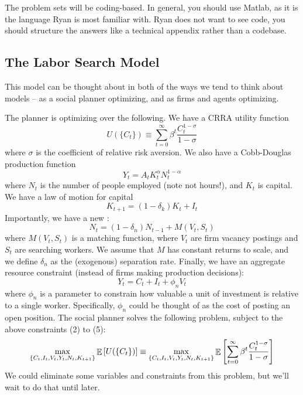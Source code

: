\documentclass[10pt]{article}
\begin{document}
The problem sets will be coding-based. In general, you should use Matlab, as it is the language Ryan is most familiar with. Ryan does not want to see code, you should structure the answers like a technical appendix rather than a codebase.

\subsection{The Labor Search Model}

This model can be thought about in both of the ways we tend to think about models -- as a social planner optimizing, and as firms and agents optimizing.

\begin{model}
	 The planner is optimizing over the following. We have a CRRA utility function
	\[
	U(\{C_t\}) \equiv \sum_{t=0}^\infty \beta^t \frac{C_t^{1-\sigma}}{1-\sigma}
	\]
	where $\sigma$ is the coefficient of relative risk aversion. We also have a Cobb-Douglas production function
	\begin{equation}
		Y_t = A_t K_t^\alpha N_t^{1-\alpha}
	\end{equation}
	where $N_t$ is the number of people employed (note not hours!), and $K_t$ is capital. We have a law of motion for capital
	\begin{equation}
	K_{t+1} = (1-\delta_k) K_t + I_t
	\end{equation}
	Importantly, we have a new :
	\begin{equation}
	N_t = (1-\delta_n)N_{t-1} + M(V_t,S_t) 
	\end{equation}
	where $M(V_t,S_t)$ is a matching function, where $V_t$ are firm vacancy postings and $S_t$ are searching workers. We assume that $M$ has constant returns to scale, and we define $\delta_n$ as the (exogenous) separation rate. Finally, we have an aggregate resource constraint (instead of firms making production decisions):
	\begin{equation}
	Y_t = C_t + I_t + \phi_n V_t
	\end{equation}
	where $\phi_n$ is a parameter to constrain how valuable a unit of investment is relative to a single worker. Specifically, $\phi_n$ could be thought of as the cost of posting an open position. The social planner solves the following problem, subject to the above constraints (2) to (5):
	\[
	\max_{\{C_t,I_t,V_t,Y_t,N_t,K_{t+1}\}} \mathop{\mathbb{E}}\left[U(\{C_t\})\right] \equiv \max_{\{C_t,I_t,V_t,Y_t,N_t,K_{t+1}\}} \mathop{\mathbb{E}}\left[ \sum_{t=0}^\infty \beta^t \frac{C_t^{1-\sigma}}{1-\sigma}\right]
	\]
	We could eliminate some variables and constraints from this problem, but we'll wait to do that until later.
\end{model}
\end{document}
